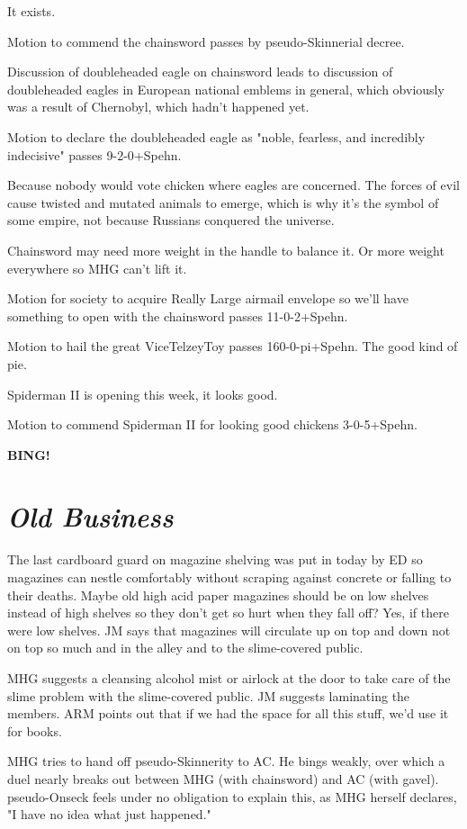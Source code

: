 \documentclass[10pt]{article}
\newcommand{\bing}{{\bf BING!} }
\newcommand{\goto}[1]{\bing \vskip 12pt \section*{{\em{#1}}}}
\begin{document}
It exists.

Motion to commend the chainsword passes by pseudo-Skinnerial decree.

Discussion of doubleheaded eagle on chainsword leads to discussion of
doubleheaded eagles in European national emblems in general, which
obviously was a result of Chernobyl, which hadn't happened yet.

Motion to declare the doubleheaded eagle as "noble, fearless, and
incredibly indecisive" passes 9-2-0+Spehn.

Because nobody would vote chicken where eagles are concerned.  The
forces of evil cause twisted and mutated animals to emerge, which is
why it's the symbol of some empire, not because Russians conquered the
universe.

Chainsword may need more weight in the handle to balance it.  Or more
weight everywhere so MHG can't lift it.

Motion for society to acquire Really Large airmail envelope so we'll
have something to open with the chainsword passes 11-0-2+Spehn.

Motion to hail the great ViceTelzeyToy passes 160-0-pi+Spehn.  The
good kind of pie.

Spiderman II is opening this week, it looks good.

Motion to commend Spiderman II for looking good chickens 3-0-5+Spehn.

\goto{Old Business}

The last cardboard guard on magazine shelving was put in today by ED
so magazines can nestle comfortably without scraping against concrete
or falling to their deaths.  Maybe old high acid paper magazines
should be on low shelves instead of high shelves so they don't get so
hurt when they fall off?  Yes, if there were low shelves.  JM says
that magazines will circulate up on top and down not on top so much
and in the alley and to the slime-covered public.

MHG suggests a cleansing alcohol mist or airlock at the door to take
care of the slime problem with the slime-covered public.  JM suggests
laminating the members.  ARM points out that if we had the space for
all this stuff, we'd use it for books.

MHG tries to hand off pseudo-Skinnerity to AC.  He bings weakly, over
which a duel nearly breaks out between MHG (with chainsword) and AC
(with gavel).  pseudo-Onseck feels under no obligation to explain
this, as MHG herself declares, "I have no idea what just happened."
\end{document}
